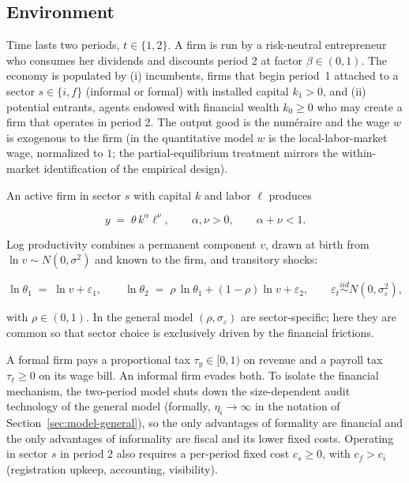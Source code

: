 \documentclass[12pt]{article}
\begin{document}
\subsection{Environment}
\label{sec:toy-env}
 
Time lasts two periods, $t\in\{1,2\}$. A firm is run by a risk-neutral entrepreneur who consumes her dividends and discounts period 2 at factor $\beta\in(0,1)$. The economy is populated by (i) incumbents, firms that begin period~1 attached to a sector $s\in\{i,f\}$ (informal or formal) with installed capital $k_{1}>0$, and (ii) potential entrants, agents endowed with financial wealth $k_{0}\geq 0$ who may create a firm that operates in period 2. The output good is the numéraire and the wage $w$ is exogenous to the firm (in the quantitative model $w$ is the local-labor-market wage, normalized to $1$; the partial-equilibrium treatment mirrors the within-market identification of the empirical design).
 
An active firm in sector $s$ with capital $k$ and labor $\ell$ produces

\begin{equation}
  y \;=\; \theta\, k^{\alpha}\ell^{\nu},
  \qquad \alpha,\nu>0,\qquad \alpha+\nu<1 .
  \label{eq:toy-tech}
\end{equation}

Log productivity combines a permanent component $v$, drawn at birth from $\ln v\sim N(0,\sigma^{2})$ and known to the firm, and transitory shocks:

\begin{equation}
  \ln\theta_{1} \;=\; \ln v + \varepsilon_{1},
  \qquad
  \ln\theta_{2} \;=\; \rho\,\ln\theta_{1} + (1-\rho)\ln v +
  \varepsilon_{2},
  \qquad \varepsilon_{t}\stackrel{iid}{\sim} N(0,\sigma_{\varepsilon}^{2}),
  \label{eq:toy-theta}
\end{equation}

with $\rho\in(0,1)$. In the general model $(\rho,\sigma_{\varepsilon})$ are sector-specific; here they are common so that sector choice is exclusively driven by the financial frictions.
 
A formal firm pays a proportional tax $\tau_y\in[0,1)$ on revenue and a payroll tax $\tau_{\ell}\geq 0$ on its wage bill. An informal firm evades both. To isolate the financial mechanism, the two-period model shuts down the size-dependent audit technology of the general model (formally, $\eta_{i}\to\infty$ in the notation of Section~\ref{sec:model-general}), so the only advantages of formality are financial and the only advantages of informality are fiscal and its lower fixed costs. Operating in sector $s$ in period 2 also requires a per-period fixed cost $c_{s}\geq0$, with $c_{f}>c_{i}$ (registration upkeep, accounting, visibility).
 
\end{document}
